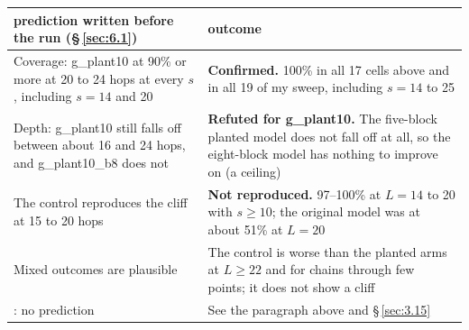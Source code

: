 \documentclass[paper=a4,fontsize=11pt,DIV=11,parskip=half,headings=small,numbers=noendperiod]{scrartcl}
\DeclareRobustCommand{\code}[1]{{\fontseries{m}\ttfamily #1}}
\DeclareRobustCommand{\hdr}[1]{\textsf{\bfseries #1}}
\begin{document}
\begin{center}\small
\begin{tabular}{@{}>{\raggedright\arraybackslash}p{6.0cm} >{\raggedright\arraybackslash}p{8.6cm}@{}}
\toprule
\hdr{prediction written before the run (\S\,\ref{sec:6.1})} & \hdr{outcome} \\
\midrule
Coverage: \code{g\_\allowbreak{}plant10} at 90\% or more at 20 to 24 hops at every $s$, including $s=14$ and 20 & \textbf{Confirmed.} 100\% in all 17 cells above and in all 19 of my sweep, including $s=14$ to 25 \\
Depth: \code{g\_\allowbreak{}plant10} still falls off between about 16 and 24 hops, and \code{g\_\allowbreak{}plant10\_\allowbreak{}b8} does not & \textbf{Refuted for \code{g\_\allowbreak{}plant10}.} The five-block planted model does not fall off at all, so the eight-block model has nothing to improve on (a ceiling) \\
The control reproduces the cliff at 15 to 20 hops & \textbf{Not reproduced.} 97–100\% at $L=14$ to 20 with $s\ge10$; the original model was at about 51\% at $L=20$ \\
Mixed outcomes are plausible & The control is worse than the planted arms at $L\ge22$ and for chains through few points; it does not show a cliff \\
\code{e\_\allowbreak{}base}: no prediction & See the paragraph above and \S\,\ref{sec:3.15} \\
\bottomrule
\end{tabular}
\end{center}
\end{document}
